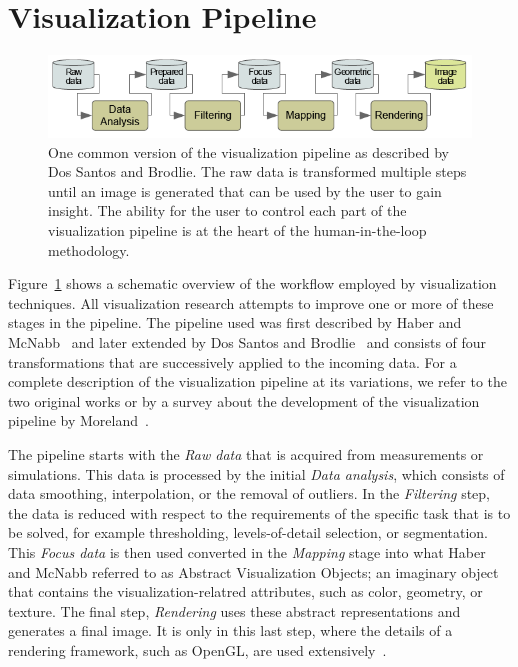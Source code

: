 \section{Visualization Pipeline} \label{cha:intro:vp}
\begin{figure}
  \centering
  \includegraphics[width=\textwidth]{figures/intro/pipeline.png}
  \caption{One common version of the visualization pipeline as described by Dos Santos and Brodlie. The raw data is transformed multiple steps until an image is generated that can be used by the user to gain insight.  The ability for the user to control each part of the visualization pipeline is at the heart of the human-in-the-loop methodology.}
  \label{fig:intro:vp}
\end{figure}

Figure~\ref{fig:intro:vp} shows a schematic overview of the workflow employed by visualization techniques.  All visualization research attempts to improve one or more of these stages in the pipeline.  The pipeline used was first described by Haber and McNabb~\cite{haber1990visualization} and later extended by Dos Santos and Brodlie~\cite{dos2004gaining} and consists of four transformations that are successively applied to the incoming data.  For a complete description of the visualization pipeline at its variations, we refer to the two original works or by a survey about the development of the visualization pipeline by Moreland~\cite{moreland2013survey}.

The pipeline starts with the \emph{Raw data} that is acquired from measurements or simulations.  This data is processed by the initial \emph{Data analysis}, which consists of data smoothing, interpolation, or the removal of outliers.  In the \emph{Filtering} step, the data is reduced with respect to the requirements of the specific task that is to be solved, for example thresholding, levels-of-detail selection, or segmentation.  This \emph{Focus data} is then used converted in the \emph{Mapping} stage into what Haber and McNabb referred to as Abstract Visualization Objects; an imaginary object that contains the visualization-relatred attributes, such as color, geometry, or texture.  The final step, \emph{Rendering} uses these abstract representations and generates a final image.  It is only in this last step, where the details of a rendering framework, such as OpenGL, are used extensively~\cite{segal2016opengl}.

